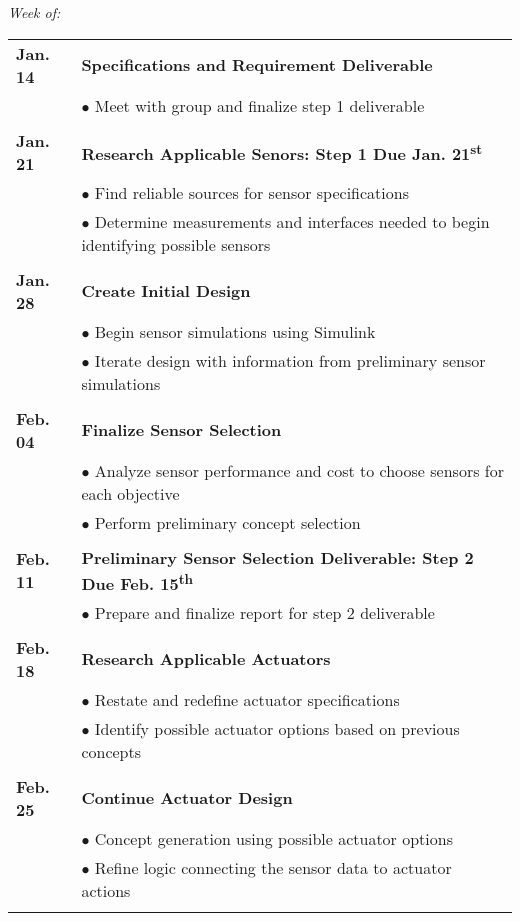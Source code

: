 \documentclass[12pt]{article}
\newcommand{\ts}{\textsuperscript}
\begin{document}
\begin{flushleft}
\textit{Week of:}

\begin{tabular}{l | l}

\textbf{Jan. 14} & \textbf{Specifications and Requirement Deliverable}\\
 & $\bullet$ Meet with group and finalize step 1 deliverable\\\\
 
\textbf{Jan. 21} & \textbf{Research Applicable Senors: Step 1 Due Jan. 21\ts{st}}\\
 & $\bullet$ Find reliable sources for sensor specifications\\
 & $\bullet$ Determine measurements and interfaces needed to begin identifying possible sensors\\\\
 
 \textbf{Jan. 28} & \textbf{Create Initial Design}\\
 & $\bullet$ Begin sensor simulations using Simulink\\
 & $\bullet$ Iterate design with information from preliminary sensor simulations\\\\
 
\textbf{Feb. 04} & \textbf{Finalize Sensor Selection}\\
 & $\bullet$ Analyze sensor performance and cost to choose sensors for each objective \\
 & $\bullet$ Perform preliminary concept selection\\\\
 
\textbf{Feb. 11} &\textbf{Preliminary Sensor Selection Deliverable: Step 2 Due Feb. 15\ts{th}}\\
 & $\bullet$ Prepare and finalize report for step 2 deliverable\\\\
 
\textbf{Feb. 18} &\textbf{Research Applicable Actuators}\\
 & $\bullet$ Restate and redefine actuator specifications\\
  & $\bullet$ Identify possible actuator options based on previous concepts\\\\
  
\textbf{Feb. 25} & \textbf{Continue Actuator Design}\\
 & $\bullet$ Concept generation using possible actuator options\\
  & $\bullet$ Refine logic connecting the sensor data to actuator actions\\\\
  

\end{tabular}
\end{flushleft}
\end{document}

